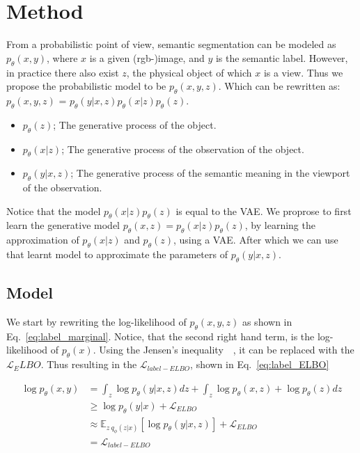 \chapter{Method}\label{chapter:first_real_chapter}
From a probabilistic point of view, semantic segmentation can be modeled as $p_\theta(x,y)$, where $x$ is a given (rgb-)image, and $y$ is the semantic label. However, in practice there also exist $z$, the physical object of which $x$ is a view. Thus we propose the probabilistic model to be $p_\theta(x,y,z)$. Which can be rewritten as: $p_\theta(x,y,z)$ = $p_\theta(y|x,z) p_\theta(x|z) p_\theta(z)$.
\begin{itemize}
    \item $p_\theta(z)$; The generative process of the object.
    \item $p_\theta(x|z)$; The generative process of the observation of the object.
    \item $p_\theta(y|x,z)$; The generative process of the semantic meaning in the viewport of the observation.
\end{itemize}
Notice that the model $p_\theta(x|z) p_\theta(z)$ is equal to the VAE. We proprose to first learn the generative model $p_\theta(x,z) = p_\theta(x|z) p_\theta(z)$, by learning the approximation of $p_\theta(x|z)$ and $p_\theta(z)$, using a VAE. After which we can use that learnt model to approximate the parameters of $p_\theta(y|x,z)$.

\section{Model}
We start by rewriting the log-likelihood of $p_\theta(x, y, z)$ as shown in Eq.~\ref{eq:label_marginal}. Notice, that the second right hand term, is the log-likelihood of $p_\theta(x)$. Using the Jensen's inequality~~\cite{jensen1906fonctions}, it can be replaced with the $\mathcal{L}_ELBO$. Thus resulting in the $\mathcal{L}_{label-ELBO}$, shown in Eq.~\ref{eq:label_ELBO}

\begin{subequations}
    \begin{align}
        \log p_\theta(x, y) & = \int_z \log p_\theta(y | x, z) dz +  \int_z \log p_\theta(x, z) + \log p_\theta(z) dz             \label{eq:label_marginal} \\
                            & \geq \log p_\theta(y | x) + \mathcal{L}_{ELBO}                                                                                \\
                            & \approx \mathbb{E}_{z~q_{\phi}(z | x)}[\log p_\theta(y|x, z)] + \mathcal{L}_{ELBO}                                            \\
                            & = \mathcal{L}_{label-ELBO} \label{eq:label_ELBO}
    \end{align}
\end{subequations}

